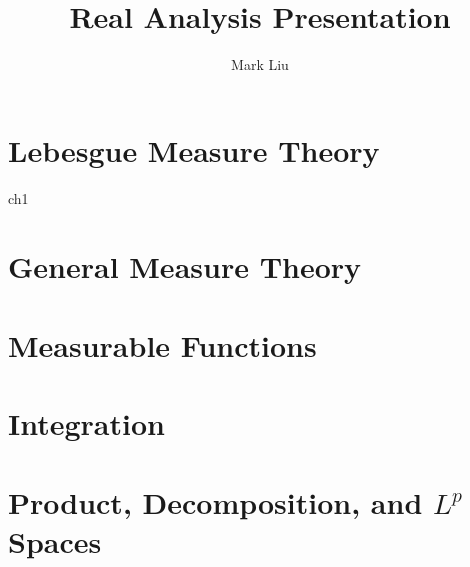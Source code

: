 \documentclass{book}
\title{Real Analysis Presentation}
\author{Mark Liu}
\begin{document}

\chapter{Lebesgue Measure Theory}
{ch1}

\chapter{General Measure Theory}

\chapter{Measurable Functions}

\chapter{Integration}

\chapter{Product, Decomposition, and $L^p$ Spaces}
\end{document}
